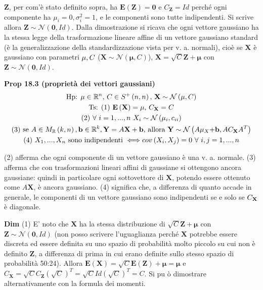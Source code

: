 \documentclass{article}
\begin{document}
$\mathbf{Z}$, per com'\`{e} stato definito sopra, ha $\mathbf{E}\left( 
\mathbf{Z}\right) =\mathbf{0}$ e $C_{\mathbf{Z}}=Id$ perch\'{e} ogni
componente ha $\mu _{i}=0,\sigma _{i}^{2}=1$, e le componenti sono tutte
indipendenti. Si scrive allora $\mathbf{Z}\sim \mathcal{N}\left( \mathbf{0}%
,Id\right) $. Dalla dimostrazione si ricava che ogni vettore gaussiano ha la
stessa legge della trasformazione lineare affine di un vettore gaussiano
standard (\`{e} la generalizzazione della standardizzazione vista per v. a.
normali), cio\`{e} se $\mathbf{X}$ \`{e} gaussiano con parametri $\mathbf{%
\mu },C$ ($\mathbf{X}\sim \mathcal{N}\left( \mathbf{\mu },C\right) $), $%
\mathbf{X}=\sqrt{C}\mathbf{Z+\mu }$ con $\mathbf{Z}\sim \mathcal{N}\left( 
\mathbf{0},Id\right) $.

\textbf{Prop 18.3 (propriet\`{a} dei vettori gaussiani)}%
\begin{gather*}
\text{Hp: }\mathbf{\mu }\in 
\mathbb{R}
^{n}\text{, }C\in S^{+}\left( n,n\right) \text{, }\mathbf{X}\sim \mathcal{N}%
\left( \mathbf{\mu },C\right) \\
\text{Ts: (1) }\mathbf{E}\left( \mathbf{X}\right) =\mathbf{\mu }\text{, }C_{%
\mathbf{X}}=C \\
\text{(2) }\forall \text{ }i=1,...,n\text{ }X_{i}\sim \mathcal{N}\left( \mu
_{i},c_{ii}\right) \\
\text{(3) se }A\in M_{%
\mathbb{R}
}\left( k,n\right) ,\mathbf{b}\in 
\mathbb{R}
^{k},\mathbf{Y}=A\mathbf{X+b}\text{, allora }\mathbf{Y}\sim \mathcal{N}%
\left( A\mathbf{\mu }_{X}\mathbf{+b},AC_{\mathbf{X}}A^{T}\right) \\
\text{(4) }X_{1},...,X_{n}\text{ sono indipendenti }\Longleftrightarrow
cov\left( X_{i},X_{j}\right) =0\text{ }\forall \text{ }i,j=1,...,n
\end{gather*}

(2) afferma che ogni componente di un vettore gaussiano \`{e} una v. a.
normale. (3) afferma che con trasformazioni lineari affini di gaussiane si
ottengono ancora gaussiane: quindi in particolare ogni sottovettore di $%
\mathbf{X}$, potendo essere ottenuto come $A\mathbf{X}$, \`{e} ancora
gaussiano. (4) significa che, a differenza di quanto accade in generale, le
componenti di un vettore gaussiano sono indipendenti se e solo se $C_{%
\mathbf{X}}$ \`{e} diagonale.

\textbf{Dim} (1) E' noto che $\mathbf{X}$ ha la stessa distribuzione di $%
\sqrt{C}\mathbf{Z+\mu }$ con $\mathbf{Z}\sim \mathcal{N}\left( \mathbf{0}%
,Id\right) $ (non posso scrivere l'uguaglianza perch\'{e} $\mathbf{X}$
potrebbe essere discreta ed essere definita su uno spazio di probabilit\`{a}
molto piccolo su cui non \`{e} definito $\mathbf{Z}$, a differenza di prima
in cui erano definite sullo stesso spazio di probabilit\`{a} 50:24). Allora $%
\mathbf{E}\left( \mathbf{X}\right) =\sqrt{C}\mathbf{E}\left( \mathbf{Z}%
\right) +\mathbf{\mu }=\mathbf{\mu }$ e $C_{\mathbf{X}}=\sqrt{C}C_{\mathbf{Z}%
}\left( \sqrt{C}\right) ^{T}=\sqrt{C}Id\left( \sqrt{C}\right) ^{T}=C$. Si pu%
\`{o} dimostrare alternativamente con la formula dei momenti.
\end{document}
